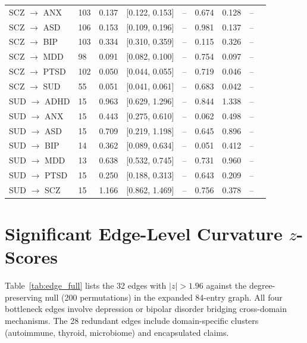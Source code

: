 \documentclass[11pt]{article}
\begin{document}
\begin{table}[h]
\begin{tabular}{llccccccc}
SCZ $\to$ ANX & 103 & 0.137 & [0.122, 0.153] & -- & 0.674 & 0.128 & -- \\
SCZ $\to$ ASD & 106 & 0.153 & [0.109, 0.196] & -- & 0.981 & 0.137 & -- \\
SCZ $\to$ BIP & 103 & 0.334 & [0.310, 0.359] & -- & 0.115 & 0.326 & -- \\
SCZ $\to$ MDD & 98 & 0.091 & [0.082, 0.100] & -- & 0.754 & 0.097 & -- \\
SCZ $\to$ PTSD & 102 & 0.050 & [0.044, 0.055] & -- & 0.719 & 0.046 & -- \\
SCZ $\to$ SUD & 55 & 0.051 & [0.041, 0.061] & -- & 0.683 & 0.042 & -- \\
\midrule
SUD $\to$ ADHD & 15 & 0.963 & [0.629, 1.296] & -- & 0.844 & 1.338 & -- \\
SUD $\to$ ANX & 15 & 0.443 & [0.275, 0.610] & -- & 0.062 & 0.498 & -- \\
SUD $\to$ ASD & 15 & 0.709 & [0.219, 1.198] & -- & 0.645 & 0.896 & -- \\
SUD $\to$ BIP & 14 & 0.362 & [0.089, 0.634] & -- & 0.051 & 0.412 & -- \\
SUD $\to$ MDD & 13 & 0.638 & [0.532, 0.745] & -- & 0.731 & 0.960 & -- \\
SUD $\to$ PTSD & 15 & 0.250 & [0.188, 0.313] & -- & 0.643 & 0.209 & -- \\
SUD $\to$ SCZ & 15 & 1.166 & [0.862, 1.469] & -- & 0.756 & 0.378 & -- \\
\bottomrule
\end{tabular}
\end{table}

\section{Significant Edge-Level Curvature $z$-Scores}
\label{app:edges}

Table~\ref{tab:edge_full} lists the 32 edges with $|z| > 1.96$ against the degree-preserving null (200 permutations) in the expanded 84-entry graph. All four bottleneck edges involve depression or bipolar disorder bridging cross-domain mechanisms. The 28 redundant edges include domain-specific clusters (autoimmune, thyroid, microbiome) and encapsulated claims.
\end{document}

